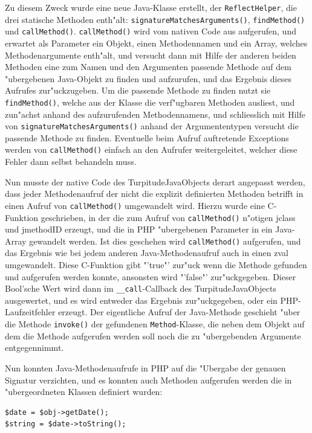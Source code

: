 Zu diesem Zweck wurde eine neue Java-Klasse erstellt, der \texttt{ReflectHelper}, die drei statische Methoden enth"alt:
\texttt{signatureMatchesArguments()}, \texttt{findMethod()} und \texttt{callMethod()}. 
\texttt{callMethod()} wird vom nativen Code aus aufgerufen, und erwartet als Parameter ein Objekt, einen Methodennamen und ein 
Array, welches Methodenargumente enth"alt, und versucht dann mit Hilfe der anderen beiden Methoden eine zum Namen und den Argumenten 
passende Methode auf dem "ubergebenen Java-Objekt zu finden und aufzurufen, und das Ergebnis dieses Aufrufes zur"uckzugeben.
Um die passende Methode zu finden nutzt sie \texttt{findMethod()}, welche aus der Klasse die verf"ugbaren Methoden ausliest, und 
zun"achst anhand des aufzurufenden Methodennamens, und schliesslich mit Hilfe von \texttt{signatureMatchesArguments()} anhand der
Argumententypen versucht die passende Methode zu finden. Eventuelle beim Aufruf auftretende Exceptions werden von \texttt{callMethod()}
einfach an den Aufrufer weitergeleitet, welcher diese Fehler dann selbst behandeln muss.

Nun musste der native Code des TurpitudeJavaObjects derart angepasst werden, dass jeder Methodenaufruf der nicht die explizit
definierten Methoden betrifft in einen Aufruf von \texttt{callMethod()} umgewandelt wird. Hierzu wurde eine C-Funktion geschrieben,
in der die zum Aufruf von \texttt{callMethod()} n"otigen jclass und jmethodID erzeugt, und die in PHP "ubergebenen Parameter
in ein Java-Array gewandelt werden. Ist dies geschehen wird \texttt{callMethod()} aufgerufen, und das Ergebnis wie bei jedem
anderen Java-Methodenaufruf auch in einen zval umgewandelt. Diese C-Funktion gibt "'true"' zur"uck wenn die Methode gefunden
und aufgerufen werden konnte, ansonsten wird "'false"' zur"uckgegeben. Dieser Bool'sche Wert wird dann im \texttt{\_\_call}-Callback
des TurpitudeJavaObjects ausgewertet, und es wird entweder das Ergebnis zur"uckgegeben, oder ein PHP-Laufzeitfehler erzeugt.
Der eigentliche Aufruf der Java-Methode geschieht "uber die Methode \texttt{invoke()} der gefundenen \texttt{Method}-Klasse, die neben
dem Objekt auf dem die Methode aufgerufen werden soll noch die zu "ubergebenden Argumente entgegennimmt.

Nun konnten Java-Methodenaufrufe in PHP auf die "Ubergabe der genauen Signatur verzichten, und es konnten auch Methoden aufgerufen
werden die in "ubergeordneten Klassen definiert wurden:

\begin{lstlisting}[caption=Verbesserter Aufruf einer Java-Methode]
$date = $obj->getDate();
$string = $date->toString();
\end{lstlisting}

